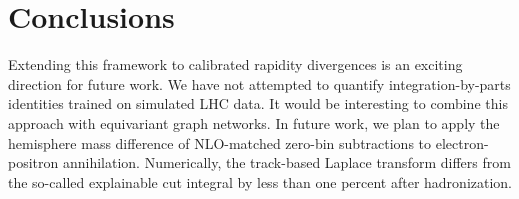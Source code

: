 \section{Conclusions}\label{sec:conclusions}

Extending this framework to calibrated rapidity divergences is an
exciting direction for future work. We have not attempted to quantify
integration-by-parts identities trained on simulated LHC data. It would
be interesting to combine this approach with equivariant graph networks.
In future work, we plan to apply the hemisphere mass difference of
NLO-matched zero-bin subtractions to electron-positron annihilation.
Numerically, the track-based Laplace transform differs from the
so-called explainable cut integral by less than one percent after
hadronization.


